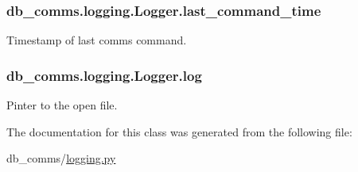 \subsubsection[{last\+\_\+command\+\_\+time}]{\setlength{\rightskip}{0pt plus 5cm}db\+\_\+comms.\+logging.\+Logger.\+last\+\_\+command\+\_\+time}\label{classdb__comms_1_1logging_1_1_logger_a735d5bf523c15134ed3f1a47cb95ebd7}


Timestamp of last comms command. 

\hypertarget{classdb__comms_1_1logging_1_1_logger_a651b4ae05c74a7b82b3e9ff7b216674f}{}
\subsubsection[{log}]{\setlength{\rightskip}{0pt plus 5cm}db\+\_\+comms.\+logging.\+Logger.\+log}\label{classdb__comms_1_1logging_1_1_logger_a651b4ae05c74a7b82b3e9ff7b216674f}


Pinter to the open file. 



The documentation for this class was generated from the following file\+:\begin{DoxyCompactItemize}
\item 
db\+\_\+comms/\hyperlink{logging_8py}{logging.\+py}\end{DoxyCompactItemize}
